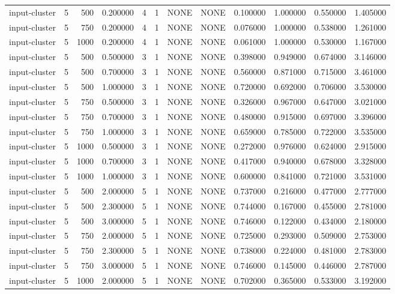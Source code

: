 \begin{tabular}{lrrrllllrrrr}
input-cluster & 5 & 500 & 0.200000 & 4 & 1 & NONE & NONE & 0.100000 & 1.000000 & 0.550000 & 1.405000 \\
input-cluster & 5 & 750 & 0.200000 & 4 & 1 & NONE & NONE & 0.076000 & 1.000000 & 0.538000 & 1.261000 \\
input-cluster & 5 & 1000 & 0.200000 & 4 & 1 & NONE & NONE & 0.061000 & 1.000000 & 0.530000 & 1.167000 \\
input-cluster & 5 & 500 & 0.500000 & 3 & 1 & NONE & NONE & 0.398000 & 0.949000 & 0.674000 & 3.146000 \\
input-cluster & 5 & 500 & 0.700000 & 3 & 1 & NONE & NONE & 0.560000 & 0.871000 & 0.715000 & 3.461000 \\
input-cluster & 5 & 500 & 1.000000 & 3 & 1 & NONE & NONE & 0.720000 & 0.692000 & 0.706000 & 3.530000 \\
input-cluster & 5 & 750 & 0.500000 & 3 & 1 & NONE & NONE & 0.326000 & 0.967000 & 0.647000 & 3.021000 \\
input-cluster & 5 & 750 & 0.700000 & 3 & 1 & NONE & NONE & 0.480000 & 0.915000 & 0.697000 & 3.396000 \\
input-cluster & 5 & 750 & 1.000000 & 3 & 1 & NONE & NONE & 0.659000 & 0.785000 & 0.722000 & 3.535000 \\
input-cluster & 5 & 1000 & 0.500000 & 3 & 1 & NONE & NONE & 0.272000 & 0.976000 & 0.624000 & 2.915000 \\
input-cluster & 5 & 1000 & 0.700000 & 3 & 1 & NONE & NONE & 0.417000 & 0.940000 & 0.678000 & 3.328000 \\
input-cluster & 5 & 1000 & 1.000000 & 3 & 1 & NONE & NONE & 0.600000 & 0.841000 & 0.721000 & 3.531000 \\
input-cluster & 5 & 500 & 2.000000 & 5 & 1 & NONE & NONE & 0.737000 & 0.216000 & 0.477000 & 2.777000 \\
input-cluster & 5 & 500 & 2.300000 & 5 & 1 & NONE & NONE & 0.744000 & 0.167000 & 0.455000 & 2.781000 \\
input-cluster & 5 & 500 & 3.000000 & 5 & 1 & NONE & NONE & 0.746000 & 0.122000 & 0.434000 & 2.180000 \\
input-cluster & 5 & 750 & 2.000000 & 5 & 1 & NONE & NONE & 0.725000 & 0.293000 & 0.509000 & 2.753000 \\
input-cluster & 5 & 750 & 2.300000 & 5 & 1 & NONE & NONE & 0.738000 & 0.224000 & 0.481000 & 2.783000 \\
input-cluster & 5 & 750 & 3.000000 & 5 & 1 & NONE & NONE & 0.746000 & 0.145000 & 0.446000 & 2.787000 \\
input-cluster & 5 & 1000 & 2.000000 & 5 & 1 & NONE & NONE & 0.702000 & 0.365000 & 0.533000 & 3.192000 \\

\end{tabular}
